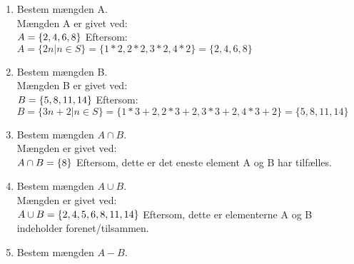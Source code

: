 \documentclass[12pt, a4paper]{article}
\begin{document}
\begin{enumerate}[label=\alph*)]
	\item {
        Bestem mængden A.\\
		Mængden A er givet ved:\\
        \begin{math}
            A = \{ 2, 4, 6, 8 \}\\
        \end{math}
            Eftersom:\\
        \begin{math}
            A = \{ 2n | n \in S \} = \{1*2, 2*2, 3*2, 4*2\} = \{2, 4, 6, 8\}
	    \end{math}
    }
 	\item {
        Bestem mængden B.\\
		Mængden B er givet ved:\\
        \begin{math}
            B = \{ 5, 8, 11, 14 \}\\
        \end{math}
            Eftersom:\\
        \begin{math}
            B = \{ 3n+2 | n \in S \} = \{1*3+2, 2*3+2, 3*3+2, 4*3+2\} = \{5, 8, 11, 14\}
	    \end{math}
    }
 	\item {
        Bestem mængden \begin{math} A \cap B \end{math}.\\
		Mængden er givet ved:\\
        \begin{math}
            A \cap B = \{8\}\\
        \end{math}
            Eftersom, dette er det eneste element A og B har tilfælles.
    }
    \item {
        Bestem mængden \begin{math} A \cup B \end{math}.\\
		Mængden er givet ved:\\
        \begin{math}
            A \cup B = \{2, 4, 5, 6, 8, 11, 14\}\\
        \end{math}
            Eftersom, dette er elementerne A og B indeholder forenet/tilsammen.
    }   
    \item {
        Bestem mængden \begin{math} A -  B \end{math}.\\
}
\end{enumerate}
\end{document}
